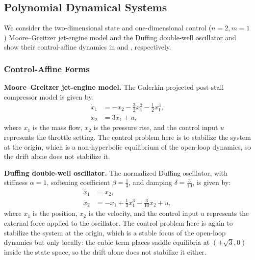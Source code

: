 \documentclass[lettersize,journal]{IEEEtran}
\begin{document}
\subsection{Polynomial Dynamical Systems}
We consider the two-dimensional state and one-dimensional control ($n=2, m=1$) 
Moore--Greitzer jet-engine model \cite{moore1986theory} and the Duffing double-well oscillator \cite{guckenheimer1983nonlinear} 
and show their control-affine dynamics in  and , respectively.

\subsubsection{Control-Affine Forms}
\textbf{Moore--Greitzer jet-engine model.}
The Galerkin-projected post-stall compressor model is given by:
\begin{equation}\label{eqn:toy_mg}
    \begin{aligned}
        \dot{x}_1 &= -x_2 - \tfrac{3}{2}x_1^2 - \tfrac{1}{2}x_1^3, \\
        \dot{x}_2 &= 3x_1 + u,
    \end{aligned}
\end{equation}
where $x_1$ is the mass flow, $x_2$ is the pressure rise, 
and the control input $u$ represents the throttle setting.
The control problem here is to stabilize the system at the origin, 
which is a non-hyperbolic equilibrium of the open-loop dynamics, 
so the drift alone does not stabilize it.

\textbf{Duffing double-well oscillator.}
The normalized Duffing oscillator, with stiffness $\alpha = 1$, softening coefficient $\beta = \tfrac{1}{3}$, 
and damping $\delta = \tfrac{3}{10}$, is given by:
\begin{equation}\label{eqn:toy_duff}
    \begin{aligned}
        \dot{x}_1 &= x_2, \\
        \dot{x}_2 &= -x_1 + \tfrac{1}{3}x_1^3 - \tfrac{3}{10} x_2 + u,
    \end{aligned}
\end{equation}
where $x_1$ is the position, $x_2$ is the velocity, 
and the control input $u$ represents the external force applied to the oscillator. 
The control problem here is again to stabilize the system at the origin, 
which is a stable focus of the open-loop dynamics but only locally: 
the cubic term places saddle equilibria at $(\pm\sqrt{3}, 0)$ inside the state space, 
so the drift alone does not stabilize it either.
\end{document}
